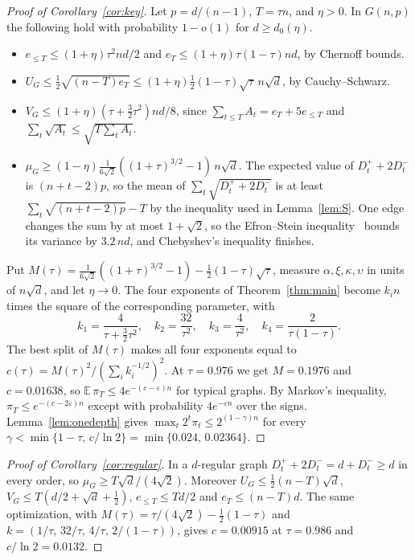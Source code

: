 \documentclass[11pt,a4paper]{article}
\theoremstyle{remark}
\newcommand{\E}{\mathbb{E}}
\begin{document}
\begin{proof}[Proof of Corollary~\ref{cor:key}]
Let $p=d/(n-1)$, $T=\tau n$, and $\eta>0$. In $G(n,p)$ the following hold with
probability $1-o(1)$ for $d\ge d_0(\eta)$.
\begin{itemize}
 \item $e_{\le T}\le(1+\eta)\tau^2nd/2$ and $e_T\le(1+\eta)\tau(1-\tau)nd$, by
 Chernoff bounds.
 \item $U_G\le\frac12\sqrt{(n-T)e_T}\le(1+\eta)\frac12(1-\tau)\sqrt\tau\,n\sqrt
 d$, by Cauchy--Schwarz.
 \item $V_G\le(1+\eta)(\tau+\frac32\tau^2)nd/8$, since
 $\sum_{t\le T}A_t=e_T+5e_{\le T}$ and $\sum_t\sqrt{A_t}\le\sqrt{T\sum_tA_t}$.
 \item $\mu_G\ge(1-\eta)\frac1{6\sqrt2}((1+\tau)^{3/2}-1)\,n\sqrt d$. The
 expected value of $D^+_t+2D^-_t$ is $(n+t-2)p$, so the mean of
 $\sum_t\sqrt{D^+_t+2D^-_t}$ is at least
 $\sum_t\sqrt{(n+t-2)p}-T$ by the inequality used in Lemma~\ref{lem:S}. One edge
 changes the sum by at most $1+\sqrt2$, so the Efron--Stein
 inequality~\cite{ES81} bounds its variance by $3.2\,nd$, and Chebyshev's
 inequality finishes.
\end{itemize}
Put $M(\tau)=\frac1{6\sqrt2}((1+\tau)^{3/2}-1)-\frac12(1-\tau)\sqrt\tau$,
measure $\alpha,\xi,\kappa,\upsilon$ in units of $n\sqrt d$, and let
$\eta\to0$. The four exponents of Theorem~\ref{thm:main} become $k_in$ times
the square of the corresponding parameter, with
\[
 k_1=\frac4{\tau+\frac32\tau^2},\quad k_2=\frac{32}{\tau^2},\quad
 k_3=\frac4{\tau^2},\quad k_4=\frac2{\tau(1-\tau)} .
\]
The best split of $M(\tau)$ makes all four exponents equal to
$c(\tau)=M(\tau)^2/(\sum_ik_i^{-1/2})^2$. At $\tau=0.976$ we get
$M=0.1976$ and $c=0.01638$, so
$\E\,\pi_T\le4e^{-(c-\varepsilon)n}$ for typical graphs. By Markov's inequality,
$\pi_T\le e^{-(c-2\varepsilon)n}$ except with probability $4e^{-\varepsilon n}$
over the signs. Lemma~\ref{lem:onedepth} gives
$\max_t2^t\pi_t\le2^{(1-\gamma)n}$ for every
$\gamma<\min\{1-\tau,\,c/\ln2\}=\min\{0.024,\,0.02364\}$.
\end{proof}

\begin{proof}[Proof of Corollary~\ref{cor:regular}]
In a $d$-regular graph $D^+_t+2D^-_t=d+D^-_t\ge d$ in every order, so
$\mu_G\ge T\sqrt d/(4\sqrt2)$. Moreover $U_G\le\frac12(n-T)\sqrt d$,
$V_G\le T(d/2+\sqrt d+\frac12)$, $e_{\le T}\le Td/2$ and $e_T\le(n-T)d$. The same
optimization, with $M(\tau)=\tau/(4\sqrt2)-\frac12(1-\tau)$ and
$k=(1/\tau,\,32/\tau,\,4/\tau,\,2/(1-\tau))$, gives $c=0.00915$ at
$\tau=0.986$ and $c/\ln2=0.0132$.
\end{proof}
\end{document}
